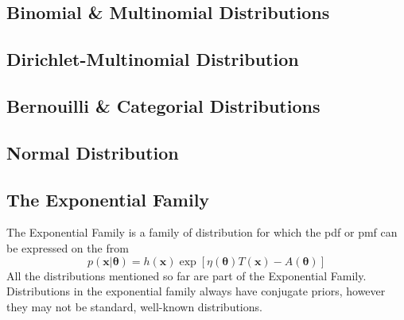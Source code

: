 \subsection{Binomial \& Multinomial Distributions}
\subsection{Dirichlet-Multinomial Distribution}
\subsection{Bernouilli \& Categorial Distributions}
\subsection{Normal Distribution}
\subsection{The Exponential Family}
The Exponential Family is a family of distribution for which the \acrshort{pdf} or \acrshort{pmf} can be expressed on the from
\begin{equation}
    p(\mathbf{x} | \boldsymbol{\theta}) = h(\mathbf{x}) \exp[\eta(\boldsymbol{\theta}) T(\mathbf{x}) - A(\boldsymbol{\theta})]
\end{equation}
All the distributions mentioned so far are part of the Exponential Family. Distributions in the exponential family always have conjugate priors, however they may not be standard, well-known distributions. %
